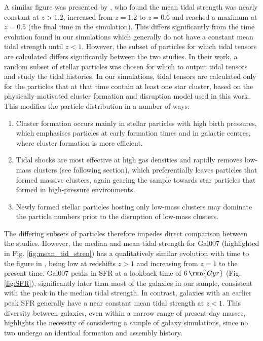 \documentclass[fleqn,usenatbib]{mnras}
\newcommand\Gyr{\,\rmn{Gyr}}
\begin{document}
A similar figure was presented by \citet[see their fig. 10]{Renaud_Agertz_and_Gieles_17}, who found the mean tidal strength was nearly constant at $z>1.2$, increased from $z=1.2$ to $z=0.6$ and reached a maximum at $z=0.5$ (the final time in the simulation).
This differs significantly from the time evolution found in our simulations which generally do not have a constant mean tidal strength until $z<1$.
However, the subset of particles for which tidal tensors are calculated differs significantly between the two studies. 
In their work, a random subset of stellar particles was chosen for which to output tidal tensors and study the tidal histories. 
In our simulations, tidal tensors are calculated only for the particles that at that time contain at least one star cluster, based on the physically-motivated cluster formation and disruption model used in this work. This modifies the particle distribution in a number of ways:
\begin{enumerate}
\item
Cluster formation occurs mainly in stellar particles with high birth pressures, which emphasises particles at early formation times and in galactic centres, where cluster formation is more efficient.
\item
Tidal shocks are most effective at high gas densities and rapidly removes low-mass clusters (see following section), which preferentially leaves particles that formed massive clusters, again gearing the sample towards star particles that formed in high-pressure environments.
\item
Newly formed stellar particles hosting only low-mass clusters may dominate the particle numbers prior to the disruption of low-mass clusters.
\end{enumerate}
The differing subsets of particles therefore impedes direct comparison between the studies.
However, the median and mean tidal strength for Gal007 (highlighted in Fig. \ref{fig:mean_tid_stren}) has a qualitatively similar evolution with time to the figure in \citet{Renaud_Agertz_and_Gieles_17}, being low at redshifts $z>1$ and increasing from $z=1$ to the present time. Gal007 peaks in SFR at a lookback time of $6 \Gyr$ (Fig. \ref{fig:SFR}), significantly later than most of the galaxies in our sample, consistent with the peak in the median tidal strength. In contrast, galaxies with an earlier peak SFR generally have a near constant mean tidal strength at $z<1$. This diversity between galaxies, even within a narrow range of present-day masses, highlights the necessity of considering a sample of galaxy simulations, since no two undergo an identical formation and assembly history.
\end{document}
